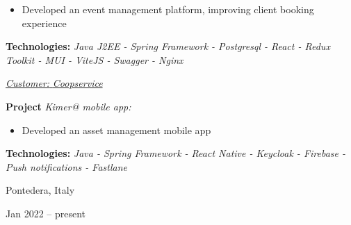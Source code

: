 \documentclass[10pt, a4paper]{article}
\newenvironment{highlights}{
    \begin{itemize}[
        topsep=0.10 cm,
        parsep=0.10 cm,
        partopsep=0pt,
        itemsep=0pt,
        leftmargin=0.4 cm + 10pt
    ]
}{
    \end{itemize}
} %
\newenvironment{twocolentry}[2][]{
    \onecolentry
    \def\secondColumn{#2}
    \setcolumnwidth{\fill, 4.5 cm}
    \begin{paracol}{2}
}{
    \switchcolumn \raggedleft \secondColumn
    \end{paracol}
    \endonecolentry
} %
\begin{document}
\begin{twocolentry}{
            \fontsize{14}{18}Pontedera, Italy

        Jan 2022 – present
            \normalsize
        }
                \begin{highlights}
                        \item Developed an event management platform, improving client booking experience
                \end{highlights}
                \faBuffer
                \textbf{ Technologies:} \textit{Java J2EE - Spring Framework - Postgresql - React - Redux Toolkit - MUI - ViteJS - Swagger - Nginx}

                \vspace{0.10 cm}

                \vspace{0.10 cm}

                \textcolor{tertiaryColor}{\faAngleDoubleRight\hspace{0.1cm}\underline{\textit{Customer:} \textit{Coopservice}}}

                \vspace{0.2cm}
                \textbf{Project \faAngleRight} \textit{Kimer@ mobile app:}

                \begin{highlights}
                        \item Developed an asset management mobile app
                \end{highlights}
                \faBuffer
                \textbf{ Technologies:} \textit{Java - Spring Framework - React Native - Keycloak - Firebase - Push notifications - Fastlane}

                \vspace{0.10 cm}

        \end{twocolentry}


        \vspace{0.2 cm}
\end{document}
